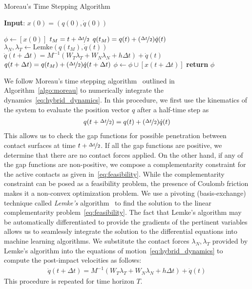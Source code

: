 %
\begin{algorithm}[tb]
    \caption{Moreau's Time Stepping Algorithm}
    \label{algo:moreau}
    \small
    \hspace*{\algorithmicindent} \textbf{Input}: $x(0) = (q(0), \dot{q}(0))$
    \begin{algorithmic}[1]
      \State $\phi \leftarrow  [x(0)]$ 
           
            \State $t_M = t + \nicefrac{\Delta t}{2}$
            \State $q(t_M) = q(t) +  (\nicefrac{\Delta t}{2}) \dot{q}(t) $
            \State $\lambda_N, \lambda_T \leftarrow \text{Lemke}(q(t_M), \dot{q}(t))$ 
            \State $\dot{q}(t+\Delta t) = M^{-1}(W_T \lambda_T + W_N \lambda_N + h\Delta t) + \dot{q}(t)$
            \State $q(t + \Delta t) =  q(t_M) +  (\nicefrac{\Delta t}{2})\dot{q}(t+\Delta t)$
            \State $\phi \leftarrow \phi \cup [x(t+\Delta t)]$
          \EndFor
        \State \textbf{return} $\phi$
    \end{algorithmic}
\end{algorithm}
%
We follow Moreau's time stepping algorithm~\cite{glocker2005formulation}
outlined in Algorithm~\eqref{algo:moreau} to numerically integrate the
dynamics~\eqref{eq:hybrid_dynamics}. 
%
In this procedure, we first use the kinematics of the system to evaluate the
position vector $q$ after a half-time step as
\begin{align*}
  q(t+\nicefrac{\Delta t}{2}) = q(t) +  (\nicefrac{\Delta t}{2}) \dot{q}(t) 
\end{align*}
%
This allows us to check the gap functions for possible penetration between
contact surfaces at time $t+\nicefrac{\Delta t}{2}$.
%
If all the gap functions are positive, we determine that there are no
contact forces applied.
%
On the other hand, if any of the gap functions are non-positive, we compose a
complementarity constraint for the active contacts as given
in~\eqref{eq:feasibility}.
%
While the complementarity constraint can be posed as a feasibility problem, the
presence of Coulomb friction makes it a non-convex optimization problem. 
%
We use a pivoting (basis-exchange) technique called \textit{Lemke's}
algorithm~\cite{acary2008numerical} to find the solution to the linear
complementarity problem~\eqref{eq:feasibility}. The fact that Lemke's algorithm
may be automatically differentiated to provide the gradients of the pertinent
variables allows us to seamlessly integrate the solution to the differential
equations into machine learning algorithms.
%
We substitute the contact forces $\lambda_N, \lambda_T$ provided by Lemke's
algorithm into the equations of motion~\eqref{eq:hybrid_dynamics} to compute the
post-impact velocities as follows:
\begin{align*}
  \dot{q}(t+\Delta t) = M^{-1}(W_T \lambda_T + W_N \lambda_N + h\Delta t) + \dot{q}(t)
\end{align*}
%
This procedure is repeated for time horizon $T$.
%

